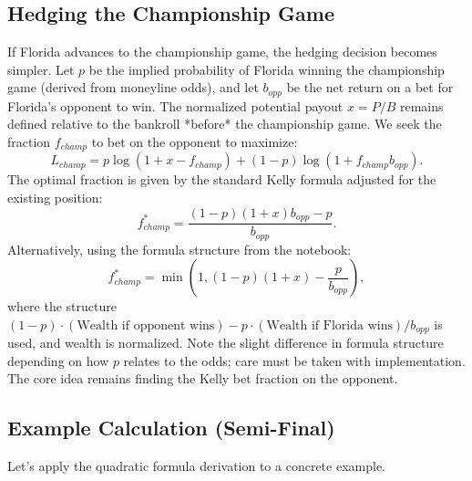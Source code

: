 \documentclass{article}
\begin{document}
\subsection{Hedging the Championship Game}
If Florida advances to the championship game, the hedging decision becomes simpler. Let $p$ be the implied probability of Florida winning the championship game (derived from moneyline odds), and let $b_{opp}$ be the net return on a bet for Florida's opponent to win. The normalized potential payout $x = P/B$ remains defined relative to the bankroll *before* the championship game. We seek the fraction $f_{champ}$ to bet on the opponent to maximize:
\[
L_{champ} = p \log(1 + x - f_{champ}) + (1-p) \log(1 + f_{champ} b_{opp}).
\]
The optimal fraction is given by the standard Kelly formula adjusted for the existing position:
\begin{equation}
f^*_{champ} = \frac{(1-p)(1+x)b_{opp} - p}{b_{opp}}.
\end{equation}
Alternatively, using the formula structure from the notebook:
\begin{equation}
f^*_{champ} = \min\left(1, (1 - p)(1 + x) - \frac{p}{b_{opp}}\right),
\end{equation}
where the structure $(1-p)\cdot(\text{Wealth if opponent wins}) - p \cdot (\text{Wealth if Florida wins}) / b_{opp}$ is used, and wealth is normalized. Note the slight difference in formula structure depending on how $p$ relates to the odds; care must be taken with implementation. The core idea remains finding the Kelly bet fraction on the opponent.

\subsection{Example Calculation (Semi-Final)}

Let's apply the quadratic formula derivation to a concrete example.
\end{document}
